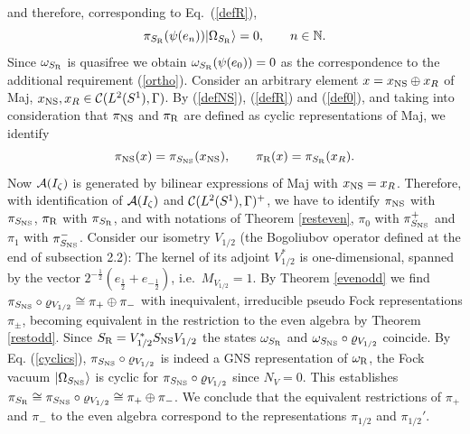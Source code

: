 \documentclass[10pt,a4paper]{article}
\begin{document}
and therefore, corresponding to Eq.~(\ref{defR}),
\[ \pi_{S_{\rm R}}(\psi(e_n))|\Omega_{S_{\rm R}}\rangle=0,
\qquad n\in\mathbb{N}. \]
Since $\omega_{S_{\rm R}}$ is quasifree we obtain
$\omega_{S_{\rm R}}(\psi(e_0))=0$ as the correspondence
to the additional requirement (\ref{ortho}).
Consider an arbitrary element $x=x_{\rm NS}\oplus x_R$
of {\sf Maj}, $x_{\rm NS},x_R\in {\cal C}(L^2(S^1),\Gamma)$.
By (\ref{defNS}), (\ref{defR}) and (\ref{def0}),
and taking into
consideration that $\pi_{\rm NS}$ and $\pi_{\rm R}$ are
defined as cyclic representations of {\sf Maj}, we
identify
\[ \pi_{\rm NS}(x)=\pi_{S_{\rm NS}}(x_{\rm NS}),\qquad
\pi_{\rm R}(x)=\pi_{S_{\rm R}}(x_R). \]
Now ${\cal A}(I_\zeta)$ is generated by bilinear
expressions of {\sf Maj} with $x_{\rm NS}=x_R$.
Therefore, with identification of
${\cal A}(I_\zeta)$ and ${\cal C}(L^2(S^1),\Gamma)^+$,
we have to identify $\pi_{\rm NS}$ with $\pi_{S_{\rm NS}}$,
$\pi_{\rm R}$ with $\pi_{S_{\rm R}}$, and with notations of
Theorem \ref{resteven}, $\pi_0$ with $\pi_{S_{\rm NS}}^+$
and $\pi_1$ with $\pi_{S_{\rm NS}}^-$. Consider our
isometry $V_{1/2}$ (the Bogoliubov operator defined
at the end of subsection 2.2): The kernel of its adjoint
$V_{1/2}^*$ is one-dimensional, spanned
by the vector $2^{-\frac{1}{2}}(e_\frac{1}{2}+
e_{-\frac{1}{2}})$, i.e.~$M_{V_{1/2}}=1$.
By Theorem \ref{evenodd} we find $\pi_{S_{\rm NS}}\circ
\varrho_{V_{1/2}}\cong\pi_+\oplus\pi_-$
with inequivalent, irreducible pseudo Fock
representations $\pi_\pm$, becoming equivalent in
the restriction to the even algebra by Theorem
\ref{restodd}. Since $S_{\rm R}=V_{1/2}^*S_{\rm NS}V_{1/2}$ the
states $\omega_{S_{\rm R}}$ and $\omega_{S_{\rm NS}}\circ
\varrho_{V_{1/2}}$ coincide.
By Eq. (\ref{cyclics}),
$\pi_{S_{\rm NS}}\circ\varrho_{V_{1/2}}$
is indeed a GNS representation of $\omega_{\rm R}$, the
Fock vacuum $|\Omega_{S_{\rm NS}}\rangle$ is cyclic for
$\pi_{S_{\rm NS}}\circ\varrho_{V_{1/2}}$ since
$N_V=0$. This establishes
$\pi_{S_{\rm R}}\cong\pi_{S_{\rm NS}}\circ
\varrho_{V_{1/2}}\cong\pi_+\oplus\pi_-$.
We conclude that the equivalent restrictions
of $\pi_+$ and $\pi_-$ to the even algebra
correspond to the representations $\pi_{1/2}$ and
$\pi_{1/2}'$.
\end{document}
